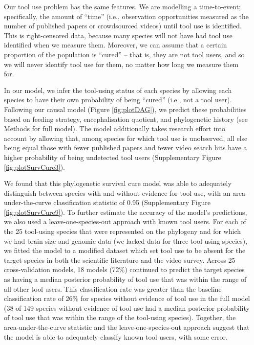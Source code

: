 \documentclass[
  man,floatsintext]{apa6}
\begin{document}
Our tool use problem has the same features. We are modelling a time-to-event; specifically, the amount of ``time'' (i.e., observation opportunities measured as the number of published papers or crowdsourced videos) until tool use is identified. This is right-censored data, because many species will not have had tool use identified when we measure them. Moreover, we can assume that a certain proportion of the population is ``cured'' -- that is, they are not tool users, and so we will never identify tool use for them, no matter how long we measure them for.

In our model, we infer the tool-using status of each species by allowing each species to have their own probability of being ``cured'' (i.e., not a tool user). Following our causal model (Figure \ref{fig:plotDAG}), we predict these probabilities based on feeding strategy, encephalisation quotient, and phylogenetic history (see Methods for full model). The model additionally takes research effort into account by allowing that, among species for which tool use is unobserved, all else being equal those with fewer published papers and fewer video search hits have a higher probability of being undetected tool users (Supplementary Figure \ref{fig:plotSurvCure3}).

We found that this phylogenetic survival cure model was able to adequately distinguish between species with and without evidence for tool use, with an area-under-the-curve classification statistic of 0.95 (Supplementary Figure \ref{fig:plotSurvCure9}). To further estimate the accuracy of the model's predictions, we also used a leave-one-species-out approach with known tool users. For each of the 25 tool-using species that were represented on the phylogeny and for which we had brain size and genomic data (we lacked data for three tool-using species), we fitted the model to a modified dataset which set tool use to be absent for the target species in both the scientific literature and the video survey. Across 25 cross-validation models, 18 models (72\%) continued to predict the target species as having a median posterior probability of tool use that was within the range of all other tool users. This classification rate was greater than the baseline classification rate of 26\% for species without evidence of tool use in the full model (38 of 149 species without evidence of tool use had a median posterior probability of tool use that was within the range of the tool-using species). Together, the area-under-the-curve statistic and the leave-one-species-out approach suggest that the model is able to adequately classify known tool users, with some error.
\end{document}
